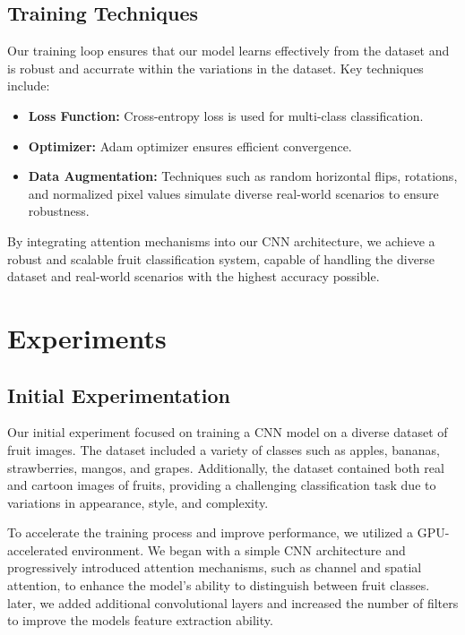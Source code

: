 \documentclass{article}
\begin{document}
\subsection{Training Techniques}
Our training loop ensures that our model learns effectively from the dataset and is robust and accurrate within the variations in the dataset. Key techniques include:
\begin{itemize}
    \item \textbf{Loss Function:} Cross-entropy loss is used for multi-class classification.
    \item \textbf{Optimizer:} Adam optimizer ensures efficient convergence.
    \item \textbf{Data Augmentation:} Techniques such as random horizontal flips, rotations, and normalized pixel values simulate diverse real-world scenarios to ensure robustness.
\end{itemize}

By integrating attention mechanisms into our CNN architecture, we achieve a robust and scalable fruit classification system, capable of handling the diverse dataset and real-world scenarios with the highest accuracy possible.


\section{Experiments}

\subsection{Initial Experimentation}
Our initial experiment focused on training a CNN model on a diverse dataset of fruit images. The dataset included a variety of classes such as apples, bananas, strawberries, mangos, and grapes. Additionally, the dataset contained both real and cartoon images of fruits, providing a challenging classification task due to variations in appearance, style, and complexity.

To accelerate the training process and improve performance, we utilized a GPU-accelerated environment. We began with a simple CNN architecture and progressively introduced attention mechanisms, such as channel and spatial attention, to enhance the model's ability to distinguish between fruit classes. later, we added additional convolutional layers and increased the number of filters to improve the models feature extraction ability.
\end{document}
